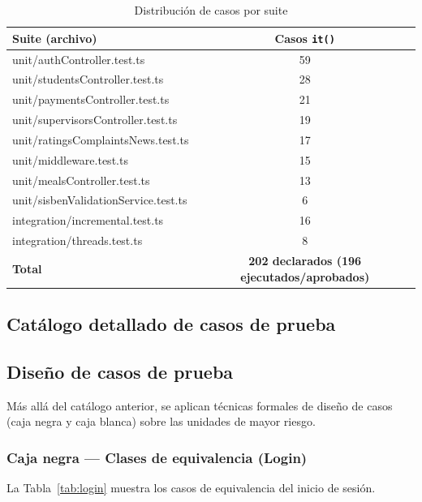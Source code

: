 \documentclass[stu,11pt,floatsintext]{apa7}
\begin{document}
\begin{table}[H]
\centering
\caption{Distribución de casos por suite}
\label{tab:distribucion}
\begin{tabularx}{\textwidth}{X c}
\toprule
\textbf{Suite (archivo)} & \textbf{Casos \texttt{it()}} \\
\midrule
unit/authController.test.ts & 59 \\
unit/studentsController.test.ts & 28 \\
unit/paymentsController.test.ts & 21 \\
unit/supervisorsController.test.ts & 19 \\
unit/ratingsComplaintsNews.test.ts & 17 \\
unit/middleware.test.ts & 15 \\
unit/mealsController.test.ts & 13 \\
unit/sisbenValidationService.test.ts & 6 \\
integration/incremental.test.ts & 16 \\
integration/threads.test.ts & 8 \\
\midrule
\textbf{Total} & \textbf{202 declarados (196 ejecutados/aprobados)} \\
\bottomrule
\end{tabularx}
\end{table}

\subsection{Catálogo detallado de casos de prueba}


\subsection{Diseño de casos de prueba}
Más allá del catálogo anterior, se aplican técnicas formales de diseño de casos
(caja negra y caja blanca) sobre las unidades de mayor riesgo.

\subsubsection{Caja negra — Clases de equivalencia (Login)}
La Tabla~\ref{tab:login} muestra los casos de equivalencia del inicio de sesión.
\end{document}
